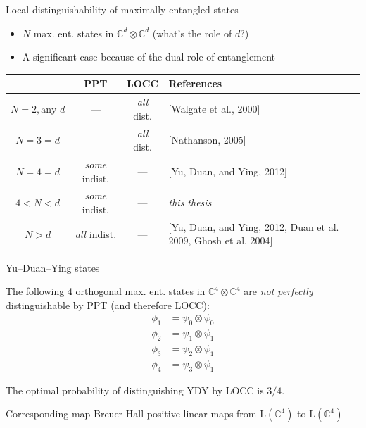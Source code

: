 \documentclass{beamer}
\def\complex{\mathbb{C}}
\newcommand{\setft}[1]{\mathrm{#1}}
\newcommand{\Lin}{\setft{L}}
\begin{document}
    \begin{frame}{Local distinguishability of maximally entangled states}
        \begin{itemize}
            \item $N$ max. ent. states in $\complex^{d}\otimes\complex^{d}$ (what's the role of $d$?)
            \item A significant case because of the dual role of entanglement
        \end{itemize}
        \vspace{-10pt}
        \begin{table}[!ht]
        \centering
        \def\arraystretch{1.5}
        \begin{tabular}{|c|c|c|p{4.3cm}|}
          \hline
            & PPT & LOCC & References\\
          \hline \hline
          $N = 2, \text{any }d$     & --- & \emph{all} dist. & [Walgate et al., 2000]\\
          \hline
          $N = 3 = d$ & --- & \emph{all} dist. & [Nathanson, 2005]\\
          \hline
          \rowcolor{Gray}
          $N = 4 = d$ & \emph{some} indist. & --- & [Yu, Duan, and Ying, 2012]\\
          \hline
          $4 < N < d$ & \emph{some} indist. & --- & \emph{this thesis}\\
          \hline
          $N > d$     & \emph{all} indist. & --- & [Yu, Duan, and Ying, 2012, \newline Duan et al. 2009, \newline Ghosh et al. 2004] \\
          \hline
        \end{tabular}
        \end{table}
    \end{frame}

    \begin{frame}{Yu--Duan--Ying states}
        \begin{theorem}[YDY, '12]
        The following 4 orthogonal max. ent. states in $\complex^{4}\otimes\complex^{4}$ are
                \emph{not perfectly} distinguishable by PPT (and therefore LOCC):
        \begin{align*}
            \phi_{1} &= \psi_{0}\otimes\psi_{0} \\
            \phi_{2} &= \psi_{1}\otimes\psi_{1} \\
            \phi_{3} &= \psi_{2}\otimes\psi_{1} \\
            \phi_{4} &= \psi_{3}\otimes\psi_{1} 
        \end{align*}
        \end{theorem}
        \begin{theorem}[new]
            The optimal probability of distinguishing YDY by LOCC is $3/4$.
        \end{theorem}
        \begin{block}{Corresponding map}
            Breuer-Hall positive linear maps from $\Lin(\complex^{4})$ to $\Lin(\complex^{4})$
        \end{block}
    \end{frame}
 
\end{document}
